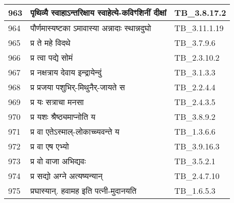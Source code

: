 \documentclass[17pt]{extarticle}
\begin{document}
\begin{longtable}{||p{0.4in}||p{4.9in}||p{0.9in}||}
    \hline
        
    963 & पृथिव्यै स्वाहाऽन्तरिक्षाय स्वाहेत्ये{-}कविꣳशिनीं दीक्षां & TB\_3.8.17.2       \\
    
    \hline
        
    964 & पौर्णमास्यष्टका ऽमावास्या अन्नादाः स्थान्नदुघो & TB\_3.11.1.19       \\
    
    \hline
        
    965 & प्र ते महे विदथे & TB\_3.7.9.6       \\
    
    \hline
        
    966 & प्र त्वा पद्ये सोमं & TB\_2.3.10.2       \\
    
    \hline
        
    967 & प्र नक्षत्राय देवाय इन्द्रायेन्दुं & TB\_3.1.3.3       \\
    
    \hline
        
    968 & प्र प्रजया पशुभिर्{-}मिथुनैर्{-}जायते स & TB\_2.2.4.4       \\
    
    \hline
        
    969 & प्र यः सत्राचा मनसा & TB\_2.4.3.5       \\
    
    \hline
        
    970 & प्र यशः श्रैष्ठ्यमाप्नोति य & TB\_3.8.9.2       \\
    
    \hline
        
    971 & प्र वा एतेऽस्माल्{-}लोकाच्च्यवन्ते य & TB\_1.3.6.6       \\
    
    \hline
        
    972 & प्र वा एष एभ्यो & TB\_3.9.16.3       \\
    
    \hline
        
    973 & प्र वो वाजा अभिद्यवः & TB\_3.5.2.1       \\
    
    \hline
        
    974 & प्र सद्यो अग्ने अत्यष्यन्यान् & TB\_2.4.7.10       \\
    
    \hline
        
    975 & प्रघास्यान्. हवामह इति पत्नी{-}मुदानयति & TB\_1.6.5.3       \\
    

\end{longtable}
\end{document}
